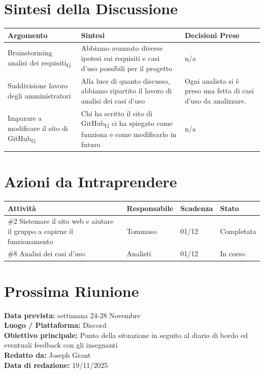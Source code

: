 \documentclass[a4paper,12pt]{article}
\newcommand{\gls}[1]{#1\textsubscript{G}}
\begin{document}
\section*{ Sintesi della Discussione}

\begin{longtable}{|p{}|p{}|p{}|}
\hline
\textbf{Argomento} & \textbf{Sintesi} & \textbf{Decisioni Prese} \\ \hline
 Brainstorming \gls{analisi dei requisiti}&Abbiamo avanzato diverse ipotesi sui requisiti e casi d'uso possibili per il progetto&n/a  \\ \hline
Suddivisione lavoro degli amministratori& Alla luce di quanto discusso, abbiamo ripartito il lavoro di analisi dei casi d'uso  & Ogni analista si è preso una fetta di casi d'uso da analizzare.  \\ \hline

Imparare a modificare il sito di \gls{GitHub}& Chi ha scritto il sito di \gls{GitHub} ci ha spiegato come funziona e come modificarlo in futuro  & n/a  \\ \hline
\end{longtable}


\section*{ Azioni da Intraprendere}

\begin{longtable}{|p{}|p{}|p{}|p{}|}
\hline
\textbf{Attività} & \textbf{Responsabile} & \textbf{Scadenza} & \textbf{Stato} \\ \hline
  \#2 Sistemare il sito web e aiutare il gruppo a capirne il funzionamento&Tommaso  & 01/12 &Completata \\ \hline
 \#8 Analisi dei casi d'uso&Analisti& 01/12 &In corso \\ \hline

  
  
\end{longtable}



\section*{ Prossima Riunione}
\textbf{Data prevista:} settimana 24-28 Novembre\\
\textbf{Luogo / Piattaforma:} Discord \\
\textbf{Obiettivo principale:} Punto della situazione in seguito al diario di bordo ed eventuali feedback con gli insegnanti\\


\textbf{Redatto da:} Joseph Grant \\
\textbf{Data di redazione:} 19/11/2025
\end{document}
